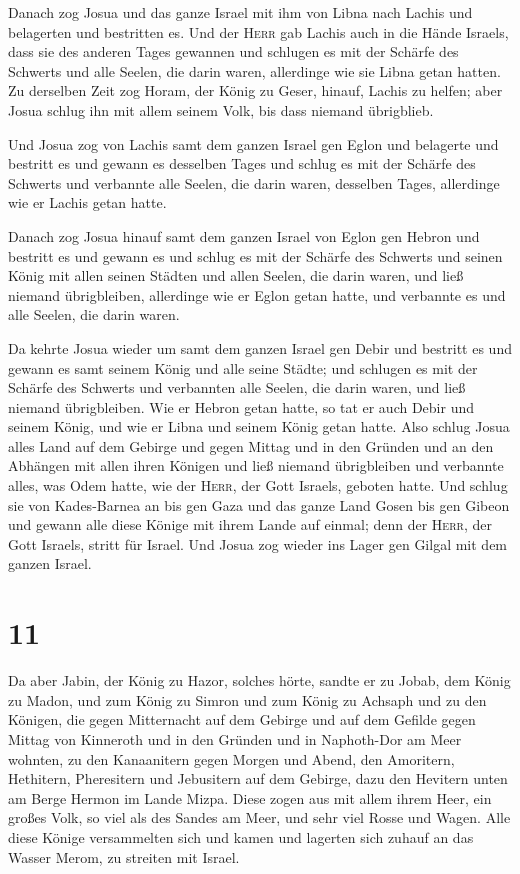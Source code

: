  Danach zog Josua und das ganze Israel mit ihm von Libna
nach Lachis und belagerten und bestritten es.  Und der
\textsc{Herr} gab Lachis auch in die Hände Israels, dass sie des anderen
Tages gewannen und schlugen es mit der Schärfe des Schwerts und alle
Seelen, die darin waren, allerdinge wie sie Libna getan hatten.
 Zu derselben Zeit zog Horam, der König zu Geser, hinauf,
Lachis zu helfen; aber Josua schlug ihn mit allem seinem Volk, bis dass
niemand übrigblieb.

 Und Josua zog von Lachis samt dem ganzen Israel gen
Eglon und belagerte und bestritt es  und gewann es
desselben Tages und schlug es mit der Schärfe des Schwerts und verbannte
alle Seelen, die darin waren, desselben Tages, allerdinge wie er Lachis
getan hatte.

 Danach zog Josua hinauf samt dem ganzen Israel von Eglon
gen Hebron und bestritt es  und gewann es und schlug es
mit der Schärfe des Schwerts und seinen König mit allen seinen Städten
und allen Seelen, die darin waren, und ließ niemand übrigbleiben,
allerdinge wie er Eglon getan hatte, und verbannte es und alle Seelen,
die darin waren.

 Da kehrte Josua wieder um samt dem ganzen Israel gen
Debir und bestritt es  und gewann es samt seinem König
und alle seine Städte; und schlugen es mit der Schärfe des Schwerts und
verbannten alle Seelen, die darin waren, und ließ niemand übrigbleiben.
Wie er Hebron getan hatte, so tat er auch Debir und seinem König, und
wie er Libna und seinem König getan hatte.  Also schlug
Josua alles Land auf dem Gebirge und gegen Mittag und in den Gründen und
an den Abhängen mit allen ihren Königen und ließ niemand übrigbleiben
und verbannte alles, was Odem hatte, wie der \textsc{Herr}, der Gott
Israels, geboten hatte.  Und schlug sie von Kades-Barnea
an bis gen Gaza und das ganze Land Gosen bis gen Gibeon 
und gewann alle diese Könige mit ihrem Lande auf einmal; denn der
\textsc{Herr}, der Gott Israels, stritt für Israel.  Und
Josua zog wieder ins Lager gen Gilgal mit dem ganzen Israel.

\hypertarget{section-10}{%
\section{11}\label{section-10}}

 Da aber Jabin, der König zu Hazor, solches hörte, sandte
er zu Jobab, dem König zu Madon, und zum König zu Simron und zum König
zu Achsaph  und zu den Königen, die gegen Mitternacht auf
dem Gebirge und auf dem Gefilde gegen Mittag von Kinneroth und in den
Gründen und in Naphoth-Dor am Meer wohnten,  zu den
Kanaanitern gegen Morgen und Abend, den Amoritern, Hethitern,
Pheresitern und Jebusitern auf dem Gebirge, dazu den Hevitern unten am
Berge Hermon im Lande Mizpa.  Diese zogen aus mit allem
ihrem Heer, ein großes Volk, so viel als des Sandes am Meer, und sehr
viel Rosse und Wagen.  Alle diese Könige versammelten sich
und kamen und lagerten sich zuhauf an das Wasser Merom, zu streiten mit
Israel.

